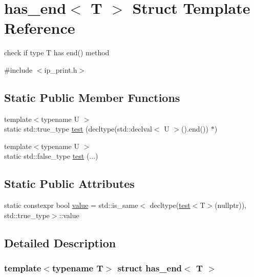 \hypertarget{structhas__end}{}\section{has\+\_\+end$<$ T $>$ Struct Template Reference}
\label{structhas__end}


check if type T has \textquotesingle{}end()\textquotesingle{} method  




{\ttfamily \#include $<$ip\+\_\+print.\+h$>$}

\subsection*{Static Public Member Functions}
\begin{DoxyCompactItemize}
\item 
{\footnotesize template$<$typename U $>$ }\\static std\+::true\+\_\+type \hyperlink{structhas__end_aa7f205d85237693f6d331008ca208caa}{test} (decltype(std\+::declval$<$ U $>$().end()) $\ast$)
\item 
{\footnotesize template$<$typename U $>$ }\\static std\+::false\+\_\+type \hyperlink{structhas__end_a7271796b8a3415685dd533aee13f9619}{test} (...)
\end{DoxyCompactItemize}
\subsection*{Static Public Attributes}
\begin{DoxyCompactItemize}
\item 
static constexpr bool \hyperlink{structhas__end_ae73ed670937d854009087106a4c181a4}{value} = std\+::is\+\_\+same$<$ decltype(\hyperlink{structhas__end_aa7f205d85237693f6d331008ca208caa}{test}$<$T$>$(nullptr)), std\+::true\+\_\+type$>$\+::value
\end{DoxyCompactItemize}


\subsection{Detailed Description}
\subsubsection*{template$<$typename T$>$\newline
struct has\+\_\+end$<$ T $>$}


